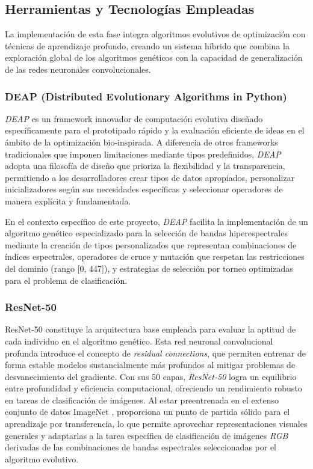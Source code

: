 \subsection{Herramientas y Tecnologías Empleadas}

La implementación de esta fase integra algoritmos evolutivos de optimización con técnicas de aprendizaje profundo, creando un sistema híbrido que combina la exploración global de los algoritmos genéticos con la capacidad de generalización de las redes neuronales convolucionales.

\subsubsection{DEAP (Distributed Evolutionary Algorithms in Python)}

\emph{DEAP} \cite{DEAP_JMLR2012} es un framework innovador de computación evolutiva diseñado específicamente para el prototipado rápido y la evaluación eficiente de ideas en el ámbito de la optimización bio-inspirada. A diferencia de otros frameworks tradicionales que imponen limitaciones mediante tipos predefinidos, \emph{DEAP} adopta una filosofía de diseño que prioriza la flexibilidad y la transparencia, permitiendo a los desarrolladores crear tipos de datos apropiados, personalizar inicializadores según sus necesidades específicas y seleccionar operadores de manera explícita y fundamentada.

\vspace{5mm}

En el contexto específico de este proyecto, \emph{DEAP} facilita la implementación de un algoritmo genético especializado para la selección de bandas hiperespectrales mediante la creación de tipos personalizados que representan combinaciones de índices espectrales, operadores de cruce y mutación que respetan las restricciones del dominio (rango [0, 447]), y estrategias de selección por torneo optimizadas para el problema de clasificación.

\subsubsection{ResNet-50}

ResNet-50 \cite{he2015deepresiduallearningimage} constituye la arquitectura base empleada para evaluar la aptitud de cada individuo en el algoritmo genético. Esta red neuronal convolucional profunda introduce el concepto de \emph{residual connections}, que permiten entrenar de forma estable modelos sustancialmente más profundos al mitigar problemas de desvanecimiento del gradiente. Con sus 50 capas, \emph{ResNet-50} logra un equilibrio entre profundidad y eficiencia computacional, ofreciendo un rendimiento robusto en tareas de clasificación de imágenes. Al estar preentrenada en el extenso conjunto de datos ImageNet \cite{deng2009imagenet}, proporciona un punto de partida sólido para el aprendizaje por transferencia, lo que permite aprovechar representaciones visuales generales y adaptarlas a la tarea específica de clasificación de imágenes \emph{RGB} derivadas de las combinaciones de bandas espectrales seleccionadas por el algoritmo evolutivo.

